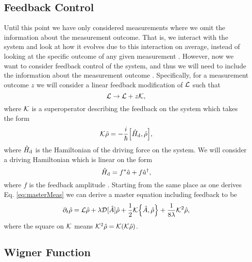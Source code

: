 \subsection{Feedback Control}
Until this point we have only considered measurements where we omit the information about the measurement outcome. That is, we interact with the system and look at how it evolves due to this interaction on average, instead of looking at the specific outcome of any given measurement \cite{Annby-Andersson:2024}. However, now we want to consider feedback control of the system, and thus we will need to include the information about the measurement outcome \cite{Annby-Andersson:2024}. Specifically, for a measurement outcome $z$ we will consider a linear feedback modification of $\mathcal{L}$ such that 
\begin{equation}
    \mathcal{L} \to \mathcal{L} + z \mathcal{K},
\end{equation}  
where $\mathcal{K}$ is a superoperator describing the feedback on the system \cite{Annby-Andersson:2024} which takes the form
\begin{equation}
    \feedback\dmatrix = - \frac{i}{\hbar} \comm{\hamiltonian_\mathrm{d}}{\dmatrix},
\end{equation}
where $\hat{H}_\mathrm{d}$ is the Hamiltonian of the driving force on the system. We will consider a driving Hamiltonian which is linear on the form
\begin{equation}
    \hat{H}_\mathrm{d} = f^* \hat{a} + f \hat{a}^{\dagger},
\end{equation}
where $f$ is the feedback amplitude \cite{Wiseman:2009}. Starting from the same place as one derives Eq. \eqref{eq:masterMeas} we can derive a master equation including feedback \cite{Annby-Andersson:2024} to be
\begin{equation}
    \dt\dmatrix = \liouvillian\dmatrix + \lambda \super{\hat{A}} \dmatrix + \frac{1}{2} \feedback \acomm{\hat{A}}{\dmatrix} + \frac{1}{8\lambda} \feedback^2 \dmatrix,
\end{equation}
where the square on $\mathcal{K}$ means $ \mathcal{K}^2 \hat{\rho} = \mathcal{K} ( \mathcal{K} \hat{\rho})$.

\subsection{Wigner Function}